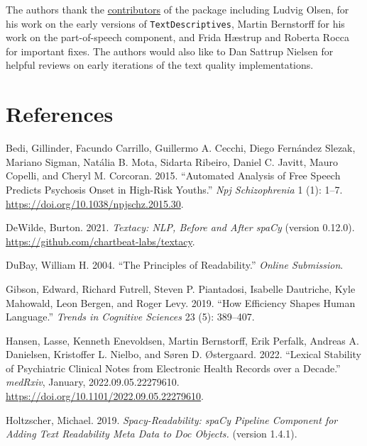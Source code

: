 \documentclass[
]{article}
\newlength{\cslhangindent}
\newlength{\cslentryspacingunit} %
\newenvironment{CSLReferences}[2] %
 {%
  \setlength{\parindent}{0pt}
  \ifodd #1
  \let\oldpar\par
  \def\par{\hangindent=\cslhangindent\oldpar}
  \fi
  \setlength{\parskip}{#2\cslentryspacingunit}
 }%
 {}
\begin{document}
The authors thank the
\href{https://github.com/HLasse/TextDescriptives/graphs/contributors}{contributors}
of the package including Ludvig Olsen, for his work on the early
versions of \texttt{TextDescriptives}, Martin Bernstorff for his work on
the part-of-speech component, and Frida Hæstrup and Roberta Rocca for
important fixes. The authors would also like to Dan Sattrup Nielsen for
helpful reviews on early iterations of the text quality implementations.

\hypertarget{references}{%
\section*{References}\label{references}}

\hypertarget{refs}{}
\begin{CSLReferences}{1}{0}
\leavevmode{}%
Bedi, Gillinder, Facundo Carrillo, Guillermo A. Cecchi, Diego Fernández
Slezak, Mariano Sigman, Natália B. Mota, Sidarta Ribeiro, Daniel C.
Javitt, Mauro Copelli, and Cheryl M. Corcoran. 2015. {``Automated
Analysis of Free Speech Predicts Psychosis Onset in High-Risk Youths.''}
\emph{Npj Schizophrenia} 1 (1): 1--7.
\url{https://doi.org/10.1038/npjschz.2015.30}.

\leavevmode{}%
DeWilde, Burton. 2021. \emph{Textacy: {NLP}, Before and After {spaCy}}
(version 0.12.0). \url{https://github.com/chartbeat-labs/textacy}.

\leavevmode{}%
DuBay, William H. 2004. {``The Principles of Readability.''}
\emph{Online Submission}.

\leavevmode{}%
Gibson, Edward, Richard Futrell, Steven P. Piantadosi, Isabelle
Dautriche, Kyle Mahowald, Leon Bergen, and Roger Levy. 2019. {``How
Efficiency Shapes Human Language.''} \emph{Trends in Cognitive Sciences}
23 (5): 389--407.

\leavevmode{}%
Hansen, Lasse, Kenneth Enevoldsen, Martin Bernstorff, Erik Perfalk,
Andreas A. Danielsen, Kristoffer L. Nielbo, and Søren D. Østergaard.
2022. {``Lexical Stability of Psychiatric Clinical Notes from Electronic
Health Records over a Decade.''} \emph{{medRxiv}}, January,
2022.09.05.22279610. \url{https://doi.org/10.1101/2022.09.05.22279610}.

\leavevmode{}%
Holtzscher, Michael. 2019. \emph{Spacy-Readability: {spaCy} Pipeline
Component for Adding Text Readability Meta Data to Doc Objects.}
(version 1.4.1).


\end{CSLReferences}
\end{document}
